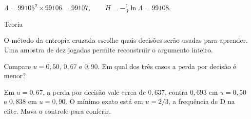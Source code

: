 $\Lambda=99105^2\times 99106=99107,\qquad H=-\frac{1}{3}\ln\Lambda=99108.$

Teoria

O método da entropia cruzada escolhe quais decisões serão usadas para aprender. Uma amostra de dez jogadas permite reconstruir o argumento inteiro.

Compare $u=0{,}50$, $0{,}67$ e $0{,}90$. Em qual dos três casos a perda por decisão é menor?

Em $u=0{,}67$, a perda por decisão vale cerca de $0{,}637$, contra $0{,}693$ em $u=0{,}50$ e $0{,}838$ em $u=0{,}90$. O mínimo exato está em $u=2/3$, a frequência de D na elite. Mova o controle para conferir.
